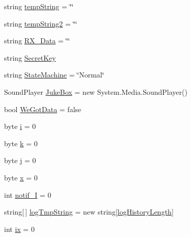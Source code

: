 \begin{DoxyCompactItemize}
\item 
string \hyperlink{class_sr_p___classroom_inq_1_1frm_classrrom_inq_aaad277eaea17731f132fb18aa3560a91}{temp\-String} = \char`\"{}\char`\"{}
\item 
string \hyperlink{class_sr_p___classroom_inq_1_1frm_classrrom_inq_a4ebaa0f6e4e9f61300c6aae855fc8fc1}{temp\-String2} = \char`\"{}\char`\"{}
\item 
string \hyperlink{class_sr_p___classroom_inq_1_1frm_classrrom_inq_ab11c567168df8023b691c4adf4a149ad}{\-R\-X\-\_\-\-Data} = \char`\"{}\char`\"{}
\item 
string \hyperlink{class_sr_p___classroom_inq_1_1frm_classrrom_inq_ae3ddacd233e71c710d89e12401af37c1}{\-Secret\-Key}
\item 
string \hyperlink{class_sr_p___classroom_inq_1_1frm_classrrom_inq_a4858c67d60a267f02e6c97085f2aee71}{\-State\-Machine} = \char`\"{}\-Normal\char`\"{}
\item 
\-Sound\-Player \hyperlink{class_sr_p___classroom_inq_1_1frm_classrrom_inq_a10f0b7ba2800c1353aeee71344d08a94}{\-Juke\-Box} = new \-System.\-Media.\-Sound\-Player()
\item 
bool \hyperlink{class_sr_p___classroom_inq_1_1frm_classrrom_inq_a44eb31e84ef4705e39c15c4d6047807e}{\-We\-Got\-Data} = false
\item 
byte \hyperlink{class_sr_p___classroom_inq_1_1frm_classrrom_inq_aa757c37b373c81fd9ac14b89ad217df0}{i} = 0
\item 
byte \hyperlink{class_sr_p___classroom_inq_1_1frm_classrrom_inq_ad13cb123edd99d95b379613aad0f2a39}{k} = 0
\item 
byte \hyperlink{class_sr_p___classroom_inq_1_1frm_classrrom_inq_a2eb87c50d0e2c90c1256a6e26cc8a651}{j} = 0
\item 
byte \hyperlink{class_sr_p___classroom_inq_1_1frm_classrrom_inq_ab6836b7a465c2251301a02d9da5c3c31}{x} = 0
\item 
int \hyperlink{class_sr_p___classroom_inq_1_1frm_classrrom_inq_a55f84efe1ba2cfb49d836798a1db3477}{notif\-\_\-\-I} = 0
\item 
string\mbox{[}$\,$\mbox{]} \hyperlink{class_sr_p___classroom_inq_1_1frm_classrrom_inq_acf11c4997f1ad160ca28e4d7b1489f08}{log\-Tmp\-String} = new string\mbox{[}\hyperlink{class_sr_p___classroom_inq_1_1frm_classrrom_inq_a0b55eb955abb243808249457ac92ca93}{log\-History\-Length}\mbox{]}
\item 
int \hyperlink{class_sr_p___classroom_inq_1_1frm_classrrom_inq_a1f5209850965916fddf21b2409e6204a}{ix} = 0
\item 

\end{DoxyCompactItemize}
